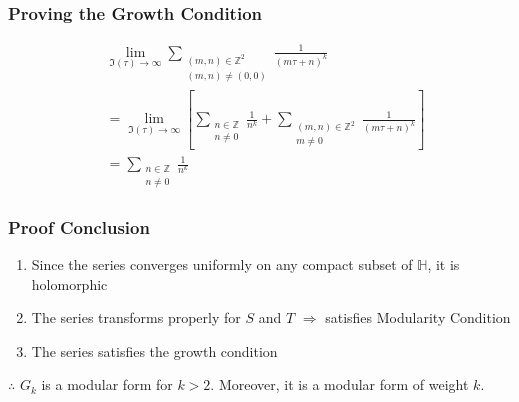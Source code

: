 \documentclass{beamer}
\begin{document}
\begin{frame}
\frametitle{Proving the Growth Condition}
\begin{align*}
& \lim_{\Im(\tau) \to \infty} \sum_{\substack{(m,n) \in \mathbb{Z}^2 \\ (m,n) \neq (0,0)}}  \frac{1}{(m \tau + n)^k} \\
& = \lim_{\Im(\tau) \to \infty} \left[ \sum_{\substack{n \in \mathbb{Z} \\ n \neq 0}} \frac{1}{n^k} + \sum_{\substack{(m,n) \in \mathbb{Z}^2 \\ m \neq 0}}  \frac{1}{(m \tau + n)^k} \right] \\
& = \sum_{\substack{n \in \mathbb{Z} \\ n \neq 0}} \frac{1}{n^k} 
\end{align*}
\end{frame}

\begin{frame}
\frametitle{Proof Conclusion}
\begin{enumerate}
\item Since the series converges uniformly on any compact subset of $\mathbb{H}$, it is holomorphic
\item The series transforms properly for $S$ and $T$ $\Rightarrow$ satisfies Modularity Condition
\item The series satisfies the growth condition
\end{enumerate}


$\therefore$ $G_k$ is a modular form for $k > 2$. Moreover, it is a modular form of weight $k$.

\end{frame}
\end{document}
